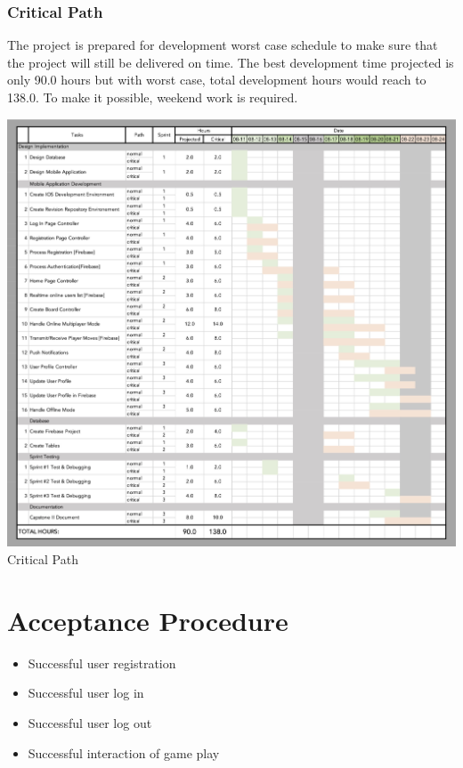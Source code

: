 \documentclass{scrartcl}
\begin{document}
        \subsubsection{Critical Path}
        The project is prepared for development worst case schedule to make sure that the project will still be delivered on time.  The best development time projected is only 90.0 hours but with worst case, total development hours would reach to 138.0. To make it possible, weekend work is required.
        \begin{center}
            \includegraphics[width=6in]{images/Gantt Critical.png}\\
        \caption{Critical Path}
        \end{center}
        
        
\section{Acceptance Procedure}
    \begin{itemize}
        \item Successful user registration
        \item Successful user log in
        \item Successful user log out
        \item Successful interaction of game play
    \end{itemize}
    ~\\
    
\end{document}
